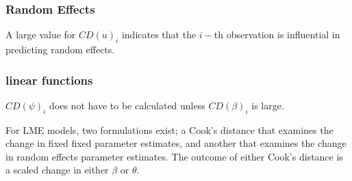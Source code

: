 \documentclass[12pt, a4paper]{article}
\begin{document}
\subsubsection{Random Effects}

A large value for $CD(u)_i$ indicates that the $i-$th observation is influential in predicting random effects.

\subsubsection{linear functions}

$CD(\psi)_i$ does not have to be calculated unless $CD(\beta)_i$ is large.

%

For LME models, two formulations exist; a Cook's distance that examines the change in fixed fixed parameter estimates, and another that examines the change in random effects parameter estimates. The outcome of either Cook's distance is a scaled change in either $\beta$ or $\theta$.


%
%
%
%
%
%
\end{document}
